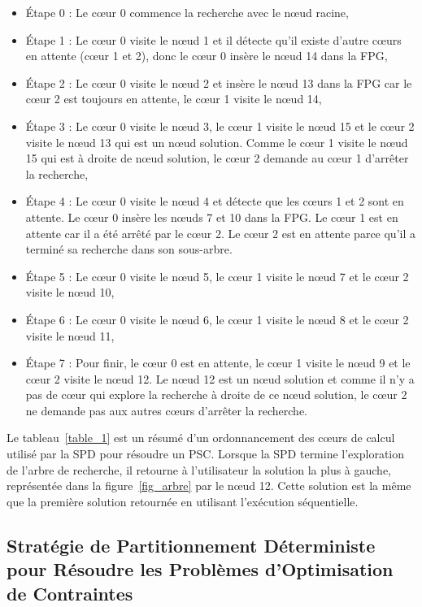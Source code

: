 \documentclass[parallelisme]{compas2014}
\begin{document}
\begin{itemize}
\item Étape 0 : Le cœur 0 commence la recherche avec le nœud racine, 
\item Étape 1 : Le cœur 0 visite le nœud 1 et il détecte qu'il existe d'autre cœurs en attente (cœur 1 et 2), donc le cœur 0 insère le nœud 14 dans la FPG,
\item Étape 2 : Le cœur 0 visite le nœud 2 et insère le nœud 13 dans la FPG car le cœur 2 est toujours en attente, le cœur 1 visite le nœud 14,
\item Étape 3 : Le cœur 0 visite le nœud 3, le cœur 1 visite le nœud 15 et le cœur 2 visite le nœud 13 qui est un nœud solution. Comme le cœur 1 visite le nœud 15 qui est à droite de nœud solution, le cœur 2 demande au cœur 1 d'arrêter la recherche,
\item Étape 4 : Le cœur 0 visite le nœud 4 et détecte que les cœurs 1 et 2 sont en attente. Le cœur 0 insère les nœuds 7 et 10 dans la FPG. Le cœur 1 est en attente car il a été arrêté par le cœur 2. Le cœur 2 est en attente parce qu'il a terminé sa recherche dans son sous-arbre.
\item Étape 5 : Le cœur 0 visite le nœud 5, le cœur 1 visite le nœud 7 et le cœur 2 visite le nœud 10,
\item Étape 6 : Le cœur 0 visite le nœud 6, le cœur 1 visite le nœud 8 et le cœur 2 visite le nœud 11,
\item Étape 7 : Pour finir, le cœur 0 est en attente, le cœur 1 visite le nœud 9 et le cœur 2 visite le nœud 12. Le nœud 12 est un nœud solution et comme il n'y a pas de cœur qui explore la recherche à droite de ce nœud solution, le cœur 2 ne demande pas aux autres cœurs d'arrêter la recherche.
\end{itemize}

Le tableau~\ref{table_1} est un résumé d'un ordonnancement des cœurs de calcul utilisé par la SPD pour résoudre un PSC. Lorsque la SPD termine l'exploration de l'arbre de recherche, il retourne à l'utilisateur la solution la plus à gauche, représentée dans la figure~\ref{fig_arbre} par le nœud 12. Cette solution est la même que la première solution retournée en utilisant l'exécution séquentielle.

\subsection{Stratégie de Partitionnement Déterministe pour Résoudre les Problèmes d'Optimisation de Contraintes}\label{SPD_cop}
\end{document}
